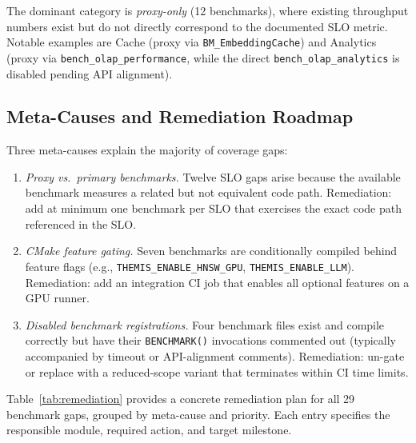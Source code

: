 \documentclass[conference]{IEEEtran}
\begin{document}
The dominant category is \emph{proxy-only} (12 benchmarks), where
existing throughput numbers exist but do not directly correspond to
the documented SLO metric.
Notable examples are Cache (proxy via \texttt{BM\_EmbeddingCache})
and Analytics (proxy via \texttt{bench\_olap\_performance}, while the
direct \texttt{bench\_olap\_analytics} is disabled pending API
alignment).

\subsection{Meta-Causes and Remediation Roadmap}
\label{ssec:meta}

Three meta-causes explain the majority of coverage gaps:
\begin{enumerate}
  \item \emph{Proxy vs.\ primary benchmarks.}
        Twelve SLO gaps arise because the available benchmark
        measures a related but not equivalent code path.
        Remediation: add at minimum one benchmark per SLO that
        exercises the exact code path referenced in the SLO.
  \item \emph{CMake feature gating.}
        Seven benchmarks are conditionally compiled behind feature
        flags (e.g., \texttt{THEMIS\_ENABLE\_HNSW\_GPU},
        \texttt{THEMIS\_ENABLE\_LLM}).
        Remediation: add an integration CI job that enables all
        optional features on a GPU runner.
  \item \emph{Disabled benchmark registrations.}
        Four benchmark files exist and compile correctly but have
        their \texttt{BENCHMARK()} invocations commented out
        (typically accompanied by timeout or API-alignment comments).
        Remediation: un-gate or replace with a reduced-scope variant
        that terminates within CI time limits.
\end{enumerate}

Table~\ref{tab:remediation} provides a concrete remediation plan
for all 29 benchmark gaps, grouped by meta-cause and priority.
Each entry specifies the responsible module, required action, and
target milestone.
\end{document}

